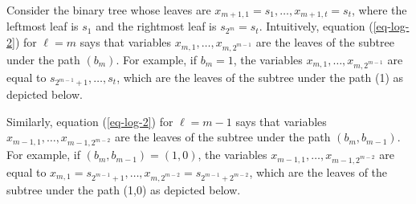 Consider the binary tree whose leaves are $x_{m+1,1}=s_1,\ldots,x_{m+1,t}=s_{t}$, where the leftmost leaf is $s_1$ and the rightmost leaf is $s_{2^m}=s_t$. Intuitively, equation (\ref{eq-log-2}) for $\ell=m$ says that variables $x_{m,1},\ldots, x_{m,2^{m-1}}$ are the leaves of the subtree under the path $(b_m)$. For example, if $b_m=1$, the variables $x_{m,1},\ldots,x_{m,2^{m-1}}$ are equal to $s_{2^{m-1}+1},\ldots,s_{t}$, which are the leaves of the subtree under the path (1) as depicted below.
\begin{center}
\end{center}
Similarly, equation (\ref{eq-log-2}) for $\ell=m-1$ says that variables $x_{m-1,1},\ldots,x_{m-1,2^{m-2}}$ are the leaves of the subtree under the path $(b_m,b_{m-1})$. For example, if $(b_m,b_{m-1})=(1,0)$, the variables $x_{m-1,1},\ldots,x_{m-1,2^{m-2}}$ are equal to $x_{m,1}=s_{2^{m-1}+1},\ldots,\allowbreak x_{m,2^{m-2}}=s_{2^{m-1}+2^{m-2}}$, which are the leaves of the subtree under the path (1,0) as depicted below.
\begin{center}
\begin{tiny}\end{tiny}
\end{center}


